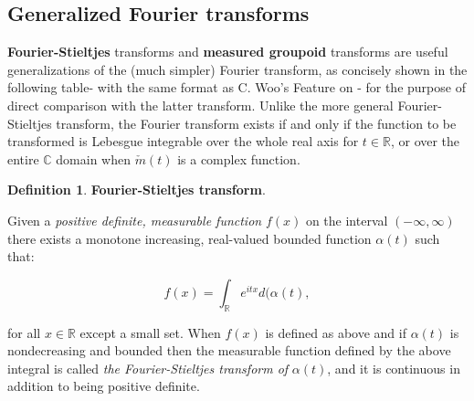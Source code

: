 \documentclass[12pt]{article}
\theoremstyle{plain}
\theoremstyle{definition}
\newtheorem{definition}{Definition}[section]
\numberwithin{equation}{section}
\newcommand{\<}{{\langle}}
\begin{document}
\subsection{Generalized Fourier transforms}

\textbf{Fourier-Stieltjes} transforms and \textbf{measured groupoid} transforms are useful generalizations of the (much simpler) Fourier transform, as concisely shown in the following table- 
with the same format as C. Woo's Feature on  
- for the purpose of direct comparison with the latter transform. Unlike the more general Fourier-Stieltjes
transform, the Fourier transform exists if and only if the function to be transformed is Lebesgue integrable over the whole real axis for $t \in{\mathbb{R}}$, or over the entire ${\mathbb{C}}$ domain when $\check{m}(t)$ is a complex function.

\begin{definition} \textbf{Fourier-Stieltjes transform}. 

Given a \emph{positive definite, measurable function} $f(x)$ on the interval 
$(-\infty ,\infty)$ there exists a monotone increasing, real-valued bounded 
function $ \alpha (t)$ such that:

\begin{equation}
f(x)=\int_\mathbb{R}e^{itx}d(\alpha (t), 
\end{equation}

for all $x \in{\mathbb{R}}$ except a small set. When $f(x)$ is defined as above and if $\alpha(t)$ is nondecreasing and bounded then the measurable function defined by the above integral is called \emph{the Fourier-Stieltjes transform of} $\alpha(t)$, and it is continuous in addition to being positive definite.

\end{definition} 
\end{document}
